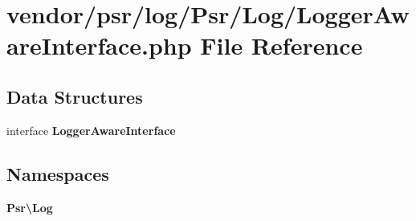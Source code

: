 \section{vendor/psr/log/\+Psr/\+Log/\+Logger\+Aware\+Interface.php File Reference}
\label{_logger_aware_interface_8php}
\subsection*{Data Structures}
\begin{DoxyCompactItemize}
\item 
interface {\bf Logger\+Aware\+Interface}
\end{DoxyCompactItemize}
\subsection*{Namespaces}
\begin{DoxyCompactItemize}
\item 
 {\bf Psr\textbackslash{}\+Log}
\end{DoxyCompactItemize}
